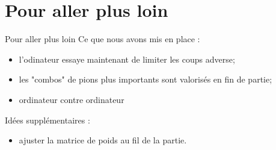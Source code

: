 \documentclass{beamer}
\begin{document}
\section{Pour aller plus loin}
\begin{frame}{Pour aller plus loin}
    Ce que nous avons mis en place :
    \begin{itemize}
        \item l'odinateur essaye maintenant de limiter les coups adverse;
        \item les "combos" de pions plus importants sont valorisés en fin de partie;
        \item ordinateur contre ordinateur
    \end{itemize}

    Idées supplémentaires :
    \begin{itemize}
        \item ajuster la matrice de poids au fil de la partie.
    \end{itemize}
\end{frame}
\end{document}
